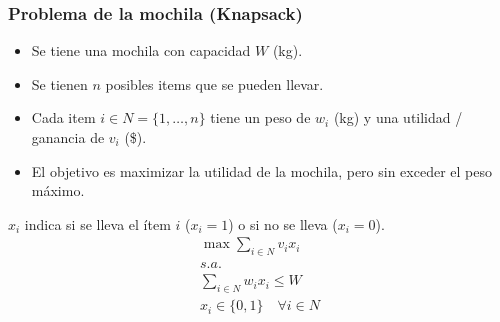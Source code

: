 \documentclass[../main.tex]{subfiles}
\begin{document}
\subsubsection{Problema de la mochila (Knapsack)}
\begin{minipage}[t]{.45\textwidth}
  \begin{itemize}
    \item Se tiene una mochila con capacidad $W$ (kg).
    \item Se tienen $n$ posibles items que se pueden llevar.
    \item Cada item $i \in N = \{ 1, \ldots, n \}$ tiene un peso de $w_i$ (kg) y una utilidad / ganancia de $v_i$ (\$).
    \item El objetivo es maximizar la utilidad de la mochila, pero sin exceder el peso máximo.
  \end{itemize}
\end{minipage}
\hfill
\begin{minipage}[t]{.45\textwidth}
  $x_i$ indica si se lleva el ítem $i$ ($x_i = 1$) o si no se lleva ($x_i = 0$).
  \begin{gather*}
    \max \sum_{i \in N} v_i x_i \\
    s.a. \\
    \sum_{i \in N} w_i x_i \leq W \\
    x_i \in \{ 0, 1 \} \quad \forall i \in N
  \end{gather*}
\end{minipage}
\end{document}

